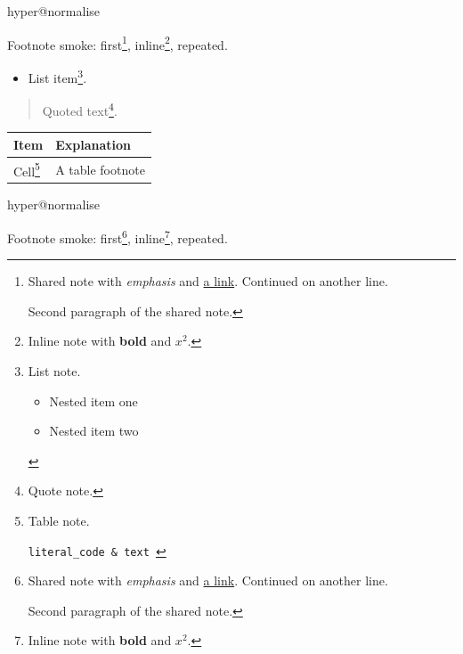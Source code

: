\ifcsname hyper@normalise\endcsname\else\PackageError{mark2tex}{Markdown links require hyperref}{Load \string\usepackage{hyperref} in the document preamble.}\fi
Footnote smoke: first\footnote{\label{mark2tex:footnote:9a73ec147020e5f3f162908b134a7721:1}Shared note with \emph{emphasis} and \href{\detokenize{https://example.org/footnote}}{a link}.
Continued on another line.

Second paragraph of the shared note.}, inline\footnote{Inline note with \textbf{bold} and $x^2$.}, repeated.

\begin{itemize}
\item List item\footnote{\label{mark2tex:footnote:9a73ec147020e5f3f162908b134a7721:2}List note.

\begin{itemize}
\item Nested item one
\item Nested item two
\end{itemize}}.
\end{itemize}

\begin{quote}
Quoted text\footnote{Quote note.}.
\end{quote}

\par\addvspace{\medskipamount}
\noindent\begin{tabularx}{\linewidth}{@{}>{\raggedright\arraybackslash}X>{\raggedright\arraybackslash}X@{}}
\toprule
Item & Explanation \\
\midrule
Cell\footnote{\label{mark2tex:footnote:9a73ec147020e5f3f162908b134a7721:3}Table note.

\texttt{literal\_code \& text
}} & A table footnote \\
\bottomrule
\end{tabularx}
\par\addvspace{\medskipamount}




\ifcsname hyper@normalise\endcsname\else\PackageError{mark2tex}{Markdown links require hyperref}{Load \string\usepackage{hyperref} in the document preamble.}\fi
Footnote smoke: first\footnote{\label{mark2tex:footnote:9a73ec147020e5f3f162908b134a7721:1}Shared note with \emph{emphasis} and \href{\detokenize{https://example.org/footnote}}{a link}.
Continued on another line.

Second paragraph of the shared note.}, inline\footnote{Inline note with \textbf{bold} and $x^2$.}, repeated.

